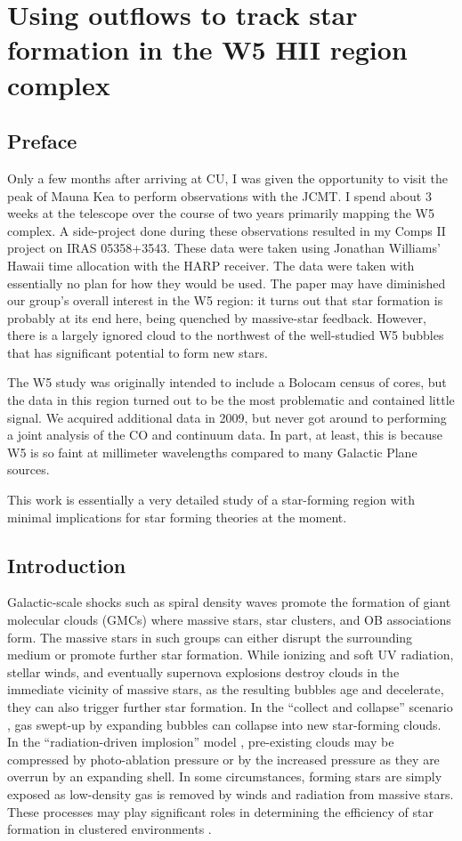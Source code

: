 
\chapter{Using outflows to track star formation in the W5 HII region complex}
\section{Preface}
Only a few months after arriving at CU, I was given the opportunity to visit
the peak of Mauna Kea to perform observations with the JCMT.  I spend about 3
weeks at the telescope over the course of two years primarily mapping the W5
complex.  A side-project done during these observations resulted in my Comps II
project on IRAS 05358+3543.  These data were taken using Jonathan Williams'
Hawaii time allocation with the HARP receiver.  The data were taken with
essentially no plan for how they would be used.  The paper may have diminished
our group's overall interest in the W5 region: it turns out that star formation
is probably at its end here, being quenched by massive-star feedback.  However,
there is a largely ignored cloud to the northwest of the well-studied W5 bubbles
that has significant potential to form new stars.  

The W5 study was originally intended to include a Bolocam census of cores, but
the data in this region turned out to be the most problematic and contained
little signal.  We acquired additional data in 2009, but never got around to
performing a joint analysis of the CO and continuum data.  In part, at least,
this is because W5 is so faint at millimeter wavelengths compared to many
Galactic Plane sources.

This work is essentially a very detailed study of a star-forming region with
minimal implications for star forming theories at the moment.

\section{Introduction}


Galactic-scale shocks such as spiral density waves promote the formation of
giant molecular clouds (GMCs) where massive stars, star clusters, and OB
associations form.  The massive stars in such groups can either disrupt the
surrounding medium or promote further star formation.  While ionizing and soft
UV radiation, stellar winds, and eventually supernova explosions destroy clouds
in the immediate vicinity of massive stars, as the resulting bubbles age and
decelerate, they can also trigger further star formation.  In the ``collect and
collapse'' scenario
\citep[e.g.][]{elmegreen:sequential:1977}, gas swept-up by expanding bubbles
can collapse into new star-forming clouds.  In the ``radiation-driven
implosion'' model \citep{bertoldi:cometary:1990,klein:implosion:1983},
pre-existing clouds may be compressed by photo-ablation pressure or by the
increased pressure as they are overrun by an expanding shell.  In some
circumstances, forming stars are simply exposed as low-density gas is removed
by winds and radiation from massive stars.  These processes may play significant roles in
determining the efficiency of star formation in clustered environments
\citep{elmegreen1998}.


